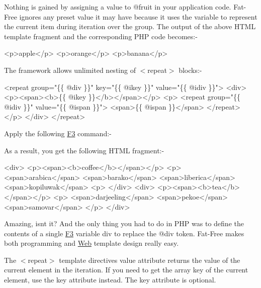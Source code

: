 Nothing is gained by assigning a value to {\ttfamily @fruit} in your application code. Fat-\/\+Free ignores any preset value it may have because it uses the variable to represent the current item during iteration over the group. The output of the above H\+T\+ML template fragment and the corresponding P\+HP code becomes\+:-\/


\begin{DoxyCode}
<p>apple</p>
<p>orange</p>
<p>banana</p>
\end{DoxyCode}


The framework allows unlimited nesting of {\ttfamily $<$repeat$>$} blocks\+:-\/


\begin{DoxyCode}
<repeat group="\{\{ @div \}\}" key="\{\{ @ikey \}\}" value="\{\{ @idiv \}\}">
    <div>
        <p><span><b>\{\{ @ikey \}\}</b></span></p>
        <p>
        <repeat group="\{\{ @idiv \}\}" value="\{\{ @ispan \}\}">
            <span>\{\{ @ispan \}\}</span>
        </repeat>
        </p>
    </div>
</repeat>
\end{DoxyCode}


Apply the following \hyperlink{class_f3}{F3} command\+:-\/




As a result, you get the following H\+T\+ML fragment\+:-\/


\begin{DoxyCode}
<div>
    <p><span><b>coffee</b></span></p>
    <p>
        <span>arabica</span>
        <span>barako</span>
        <span>liberica</span>
        <span>kopiluwak</span>
    <p>
</div>
<div>
    <p><span><b>tea</b></span></p>
    <p>
        <span>darjeeling</span>
        <span>pekoe</span>
        <span>samovar</span>
    </p>
</div>
\end{DoxyCode}


Amazing, isn\textquotesingle{}t it? And the only thing you had to do in P\+HP was to define the contents of a single \hyperlink{class_f3}{F3} variable {\ttfamily div} to replace the {\ttfamily @div} token. Fat-\/\+Free makes both programming and \hyperlink{class_web}{Web} template design really easy.

The {\ttfamily $<$repeat$>$} template directive\textquotesingle{}s {\ttfamily value} attribute returns the value of the current element in the iteration. If you need to get the array key of the current element, use the {\ttfamily key} attribute instead. The {\ttfamily key} attribute is optional.

